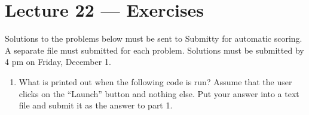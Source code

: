 \documentclass[letterpaper,10pt,english]{sphinxmanual}
\begin{document}
\chapter{Lecture 22 — Exercises}
\label{\detokenize{lecture_notes/lec22_tkinter_exercises/exercises:lecture-22-exercises}}\label{\detokenize{lecture_notes/lec22_tkinter_exercises/exercises::doc}}
Solutions to the problems below must be sent to Submitty for
automatic scoring.  A separate file must submitted for each problem.
Solutions must be submitted by 4 pm on Friday, December 1.
\begin{enumerate}
\item {} 
What is printed out when the following code is run? Assume
that the user clicks on the “Launch” button and nothing else.  Put
your answer into a text file and submit it as the answer to
part 1.

%
\begin{sphinxVerbatim}[commandchars=\\\{\}]
   


\end{sphinxVerbatim}
\end{enumerate}
\end{document}
